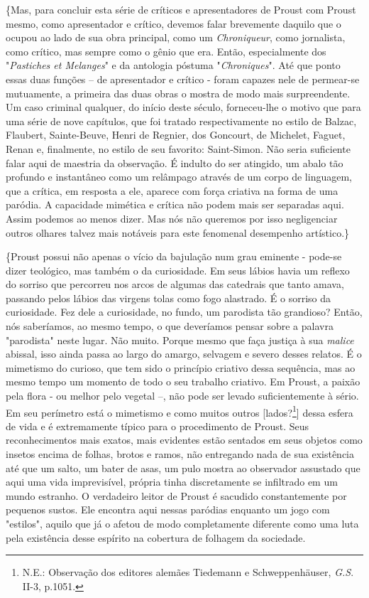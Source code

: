 \{Mas, para concluir esta série de críticos e apresentadores de Proust
com Proust mesmo, como apresentador e crítico, devemos falar brevemente
daquilo que o ocupou ao lado de sua obra principal, como um
\emph{Chroniqueur}, como jornalista, como crítico, mas sempre como o
gênio que era. Então, especialmente dos "\emph{Pastiches et Melanges}" e
da antologia póstuma "\emph{Chroniques}". Até que ponto essas duas
funções -- de apresentador e crítico - foram capazes nele de permear-se
mutuamente, a primeira das duas obras o mostra de modo mais
surpreendente. Um caso criminal qualquer, do início deste século,
forneceu-lhe o motivo que para uma série de nove capítulos, que foi
tratado respectivamente no estilo de Balzac, Flaubert, Sainte-Beuve,
Henri de Regnier, dos Goncourt, de Michelet, Faguet, Renan e,
finalmente, no estilo de seu favorito: Saint-Simon. Não seria suficiente
falar aqui de maestria da observação. É indulto do ser atingido, um
abalo tão profundo e instantâneo como um relâmpago através de um corpo
de linguagem, que a crítica, em resposta a ele, aparece com força
criativa na forma de uma paródia. A capacidade mimética e crítica não
podem mais ser separadas aqui. Assim podemos ao menos dizer. Mas nós não
queremos por isso negligenciar outros olhares talvez mais notáveis para
este fenomenal desempenho artístico.\}

\{Proust possui não apenas o vício da bajulação num grau eminente -
pode-se dizer teológico, mas também o da curiosidade. Em seus lábios
havia um reflexo do sorriso que percorreu nos arcos de algumas das
catedrais que tanto amava, passando pelos lábios das virgens tolas como
fogo alastrado. É o sorriso da curiosidade. Fez dele a curiosidade, no
fundo, um parodista tão grandioso? Então, nós saberíamos, ao mesmo
tempo, o que deveríamos pensar sobre a palavra "parodista" neste lugar.
Não muito. Porque mesmo que faça justiça à sua \emph{malice} abissal,
isso ainda passa ao largo do amargo, selvagem e severo desses relatos. É
o mimetismo do curioso, que tem sido o princípio criativo dessa
sequência, mas ao mesmo tempo um momento de todo o seu trabalho
criativo. Em Proust, a paixão pela flora - ou melhor pelo vegetal --,
não pode ser levado suficientemente à sério. Em seu perímetro está o
mimetismo e como muitos outros {[}lados?\footnote{N.E.: Observação dos
  editores alemães Tiedemann e Schweppenhäuser, \emph{G.S}. II-3,
  p.1051.}{]} dessa esfera de vida e é extremamente típico para o
procedimento de Proust. Seus reconhecimentos mais exatos, mais evidentes
estão sentados em seus objetos como insetos encima de folhas, brotos e
ramos, não entregando nada de sua existência até que um salto, um bater
de asas, um pulo mostra ao observador assustado que aqui uma vida
imprevisível, própria tinha discretamente se infiltrado em um mundo
estranho. O verdadeiro leitor de Proust é sacudido constantemente por
pequenos sustos. Ele encontra aqui nessas paródias enquanto um jogo com
"estilos", aquilo que já o afetou de modo completamente diferente como
uma luta pela existência desse espírito na cobertura de folhagem da
sociedade.

